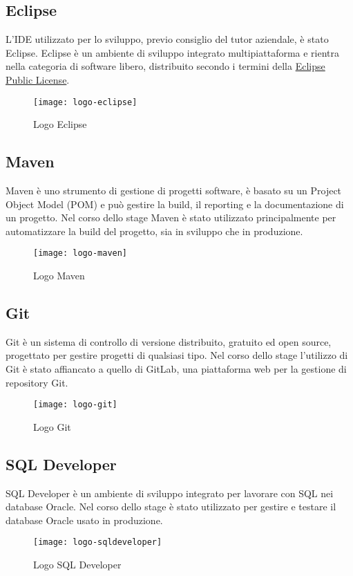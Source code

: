 \subsection{Eclipse}
L'IDE utilizzato per lo sviluppo, previo consiglio del tutor aziendale, è stato Eclipse.
Eclipse è un ambiente di sviluppo integrato multipiattaforma e rientra nella categoria di software libero, distribuito secondo i termini della \href{https://www.eclipse.org/legal/epl-2.0/}{Eclipse Public License}.
\begin{figure}[h]
    \begin{center}
    \texttt{[image: logo-eclipse]}
    \caption{Logo Eclipse}
    \label{fig:figure10}
    \end{center}
\end{figure}

\subsection{Maven}
Maven è uno strumento di gestione di progetti software, è basato su un Project Object Model (POM) e può gestire la build, il reporting e la documentazione di un progetto. Nel corso dello stage Maven è stato utilizzato principalmente per automatizzare la build del progetto, sia in sviluppo che in produzione.
\begin{figure}[h]
    \begin{center}
    \texttt{[image: logo-maven]}
    \caption{Logo Maven}
    \label{fig:figure11}
    \end{center}
\end{figure}

\subsection{Git}
Git è un sistema di controllo di versione distribuito, gratuito ed open source, progettato per gestire progetti di qualsiasi tipo. Nel corso dello stage l'utilizzo di Git è stato affiancato a quello di GitLab, una piattaforma web per la gestione di repository Git.
\begin{figure}[h]
    \begin{center}
    \texttt{[image: logo-git]}
    \caption{Logo Git}
    \label{fig:figure12}
    \end{center}
\end{figure}
\subsection{SQL Developer}
SQL Developer è un ambiente di sviluppo integrato per lavorare con SQL nei database Oracle. Nel corso dello stage è stato utilizzato per gestire e testare il database Oracle usato in produzione.
\begin{figure}[h]
    \begin{center}
    \texttt{[image: logo-sqldeveloper]}
    \caption{Logo SQL Developer}
    \label{fig:figure13}
    \end{center}
\end{figure}

